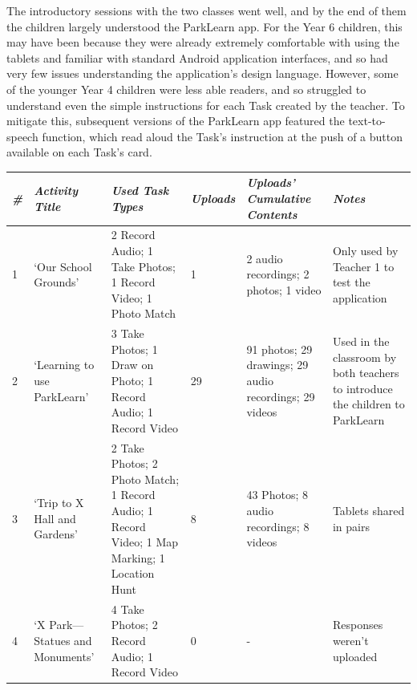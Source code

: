 The introductory sessions with the two classes went well, and by the end of them the children largely understood the ParkLearn app. For the Year 6 children, this may have been because they were already extremely comfortable with using the tablets and familiar with standard Android application interfaces, and so had very few issues understanding the application’s design language. However, some of the younger Year 4 children were less able readers, and so struggled to understand even the simple instructions for each Task created by the teacher. To mitigate this, subsequent versions of the ParkLearn app featured the text-to-speech function, which read aloud the Task’s instruction at the push of a button available on each Task's card.

\begin{table}[]
    \centering
    \begin{tabularx}{\linewidth}{ 
| p{4mm} 
| >{\raggedright\arraybackslash}X 
| >{\raggedright\arraybackslash}X 
| p{13mm}
| >{\raggedright\arraybackslash}X 
| >{\raggedright\arraybackslash}X 
|}
\hline
\small\textit{\#}
    & \small\textit{Activity Title} 
    & \small\textit{Used Task Types}
    & \small\textit{Uploads}
    & \small\textit{Uploads' Cumulative Contents}
    & \small\textit{Notes}\\
\hline
\small 1 
    & \footnotesize `Our School Grounds' 
    & \footnotesize 2 Record Audio; 1 Take Photos; 1 Record Video; 1 Photo Match 
    & \footnotesize 1  
    & \footnotesize 2 audio recordings; 2 photos; 1 video
    & \footnotesize Only used by Teacher 1 to test the application\\
\hline
\small 2
    & \footnotesize `Learning to use ParkLearn' 
    & \footnotesize 3 Take Photos; 1 Draw on Photo; 1 Record Audio; 1 Record Video 
    & \footnotesize 29  
    & \footnotesize 91 photos; 29 drawings; 29 audio recordings; 29 videos
    & \footnotesize Used in the classroom by both teachers to introduce the children to ParkLearn\\
\hline
\small 3
    & \footnotesize `Trip to X Hall and Gardens' 
    & \footnotesize 2 Take Photos; 2 Photo Match; 1 Record Audio; 1 Record Video; 1 Map Marking; 1 Location Hunt 
    & \footnotesize 8  
    & \footnotesize 43 Photos; 8 audio recordings; 8 videos
    & \footnotesize Tablets shared in pairs\\
\hline
\small 4 
    & \footnotesize `X Park---Statues and Monuments' 
    & \footnotesize 4 Take Photos; 2 Record Audio; 1 Record Video
    & \footnotesize 0  
    & \footnotesize -
    & \footnotesize Responses weren't uploaded\\

\end{tabularx}
\end{table}
